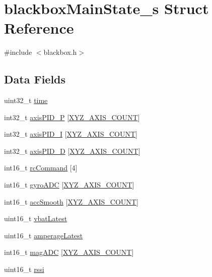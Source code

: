 \hypertarget{structblackboxMainState__s}{\section{blackbox\+Main\+State\+\_\+s Struct Reference}
\label{structblackboxMainState__s}
}


{\ttfamily \#include $<$blackbox.\+h$>$}

\subsection*{Data Fields}
\begin{DoxyCompactItemize}
\item 
uint32\+\_\+t \hyperlink{structblackboxMainState__s_a9571e17beb1935633b58ec60d844db4d}{time}
\item 
int32\+\_\+t \hyperlink{structblackboxMainState__s_aa4c1b0dda7b33c9a087a9c212e7bf0c6}{axis\+P\+I\+D\+\_\+\+P} \mbox{[}\hyperlink{axis_8h_a93ac071aee723ba4580dfc8b72ae847f}{X\+Y\+Z\+\_\+\+A\+X\+I\+S\+\_\+\+C\+O\+U\+N\+T}\mbox{]}
\item 
int32\+\_\+t \hyperlink{structblackboxMainState__s_aaf37c5aeff41b3dd1eae418405d59144}{axis\+P\+I\+D\+\_\+\+I} \mbox{[}\hyperlink{axis_8h_a93ac071aee723ba4580dfc8b72ae847f}{X\+Y\+Z\+\_\+\+A\+X\+I\+S\+\_\+\+C\+O\+U\+N\+T}\mbox{]}
\item 
int32\+\_\+t \hyperlink{structblackboxMainState__s_a9d07a90cd3653feec4d5bc42d5ee81a0}{axis\+P\+I\+D\+\_\+\+D} \mbox{[}\hyperlink{axis_8h_a93ac071aee723ba4580dfc8b72ae847f}{X\+Y\+Z\+\_\+\+A\+X\+I\+S\+\_\+\+C\+O\+U\+N\+T}\mbox{]}
\item 
int16\+\_\+t \hyperlink{structblackboxMainState__s_a762befb05a790eae4e12f91e15eaf1ab}{rc\+Command} \mbox{[}4\mbox{]}
\item 
int16\+\_\+t \hyperlink{structblackboxMainState__s_ac7d4fefd0c02080a31402d2477f2d2ac}{gyro\+A\+D\+C} \mbox{[}\hyperlink{axis_8h_a93ac071aee723ba4580dfc8b72ae847f}{X\+Y\+Z\+\_\+\+A\+X\+I\+S\+\_\+\+C\+O\+U\+N\+T}\mbox{]}
\item 
int16\+\_\+t \hyperlink{structblackboxMainState__s_a7fdaef47b1820d80de5f98a3f26ed892}{acc\+Smooth} \mbox{[}\hyperlink{axis_8h_a93ac071aee723ba4580dfc8b72ae847f}{X\+Y\+Z\+\_\+\+A\+X\+I\+S\+\_\+\+C\+O\+U\+N\+T}\mbox{]}
\item 
uint16\+\_\+t \hyperlink{structblackboxMainState__s_a755ac9d3422af2a9905207a3ecb25e44}{vbat\+Latest}
\item 
uint16\+\_\+t \hyperlink{structblackboxMainState__s_ab6df3da6c422e418006f8ad2666c75ee}{amperage\+Latest}
\item 
int16\+\_\+t \hyperlink{structblackboxMainState__s_a3296e9412f25fdb7af57238773b3e9db}{mag\+A\+D\+C} \mbox{[}\hyperlink{axis_8h_a93ac071aee723ba4580dfc8b72ae847f}{X\+Y\+Z\+\_\+\+A\+X\+I\+S\+\_\+\+C\+O\+U\+N\+T}\mbox{]}
\item 
uint16\+\_\+t \hyperlink{structblackboxMainState__s_aa77d50912ffcb5473411467a739d02f0}{rssi}
\end{DoxyCompactItemize}


